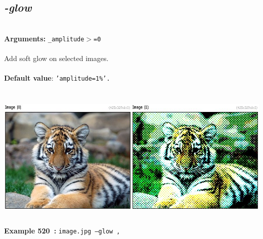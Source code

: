 \documentclass[a4paper,11pt,twoside]{book}
\begin{document}
\subsection{\emph{-glow} }\vspace*{-0.5em}
~\\\textbf{Arguments: } 
{\small \texttt{\_amplitude$>$=0}}\\~\\
Add soft glow on selected images.
~\\~\\\textbf{Default value}: {\small \texttt{'amplitude=1\%'.}}
\begin{center}\includegraphics[keepaspectratio=true,height=7cm,width=\textwidth]{img/gmic_def520.jpg}\\
{\footnotesize \textbf{Example 520~:} \texttt{image.jpg --glow ,}}
\end{center}
\end{document}
